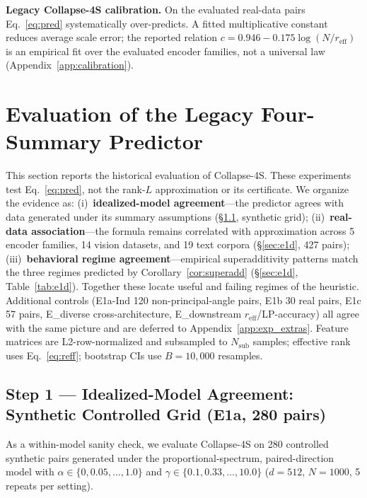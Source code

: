 \documentclass{article}
\newcommand{\reff}{\ensuremath{r_{\mathrm{eff}}}\xspace}
\begin{document}
\textbf{Legacy Collapse-4S calibration.}
On the evaluated real-data pairs Eq.~\eqref{eq:pred} systematically
over-predicts.  A fitted multiplicative constant reduces average scale error;
the reported relation $c{=}0.946{-}0.175\log(N/\reff)$ is an empirical fit
over the evaluated encoder families, not a universal law
(Appendix~\ref{app:calibration}).


\section{Evaluation of the Legacy Four-Summary Predictor}
\label{sec:experiments}

This section reports the historical evaluation of Collapse-4S.  These
experiments test Eq.~\eqref{eq:pred}, not the rank-$L$ approximation or its
certificate.  We organize the evidence as:
(i)~\textbf{idealized-model agreement}---the predictor agrees with data
generated under its summary assumptions (§\ref{sec:e1a_main}, synthetic grid);
(ii)~\textbf{real-data association}---the formula remains correlated with
approximation across 5 encoder families, 14 vision datasets,
and 19 text corpora (§\ref{sec:e1d}, 427 pairs);
(iii)~\textbf{behavioral regime agreement}---empirical superadditivity
patterns match the three regimes predicted by
Corollary~\ref{cor:superadd} (§\ref{sec:e1d}, Table~\ref{tab:e1d}).
Together these locate useful and failing regimes of the heuristic.
Additional controls (E1a-Ind 120 non-principal-angle pairs,
E1b 30 real pairs, E1c 57 pairs, E\_diverse cross-architecture,
E\_downstream $\reff$/LP-accuracy) all agree with the same picture
and are deferred to Appendix~\ref{app:exp_extras}.
Feature matrices are L2-row-normalized and subsampled to
$N_{\mathrm{sub}}$ samples; effective rank uses Eq.~\eqref{eq:reff};
bootstrap CIs use $B=10{,}000$ resamples.

\subsection{Step 1 --- Idealized-Model Agreement: Synthetic Controlled Grid (E1a, 280 pairs)}
\label{sec:e1a_main}

As a within-model sanity check, we evaluate Collapse-4S on
280 controlled synthetic pairs generated under the proportional-spectrum,
paired-direction model
with $\alpha\in\{0,0.05,\ldots,1.0\}$ and $\gamma\in\{0.1,0.33,\ldots,10.0\}$
($d{=}512$, $N{=}1000$, 5 repeats per setting).
\end{document}
